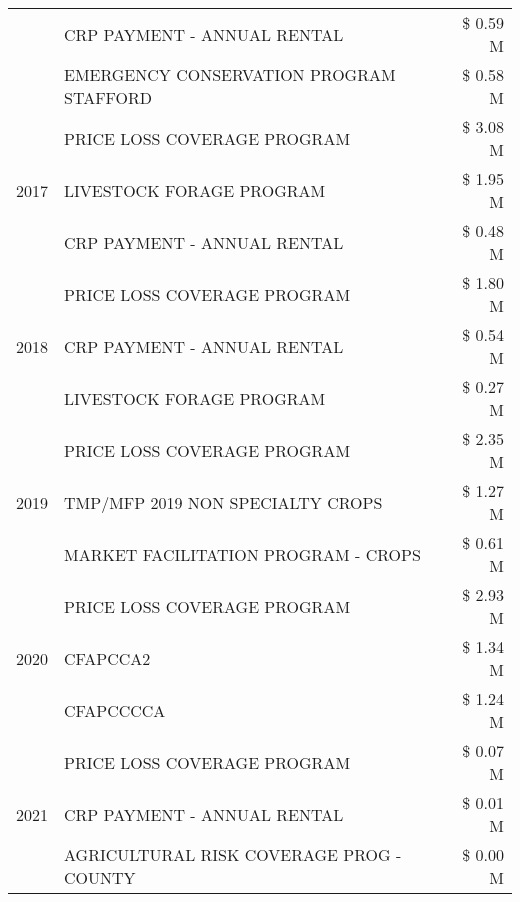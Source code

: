 \begin{tabular}{llr}
 & CRP PAYMENT - ANNUAL RENTAL                   & \$ 0.59 M \\
 & EMERGENCY CONSERVATION PROGRAM STAFFORD       & \$ 0.58 M \\
\cline{1-3}
\multirow[t]{3}{*}{2017} & PRICE LOSS COVERAGE PROGRAM & \$ 3.08 M \\
 & LIVESTOCK FORAGE PROGRAM & \$ 1.95 M \\
 & CRP PAYMENT - ANNUAL RENTAL & \$ 0.48 M \\
\cline{1-3}
\multirow[t]{3}{*}{2018} & PRICE LOSS COVERAGE PROGRAM & \$ 1.80 M \\
 & CRP PAYMENT - ANNUAL RENTAL & \$ 0.54 M \\
 & LIVESTOCK FORAGE PROGRAM & \$ 0.27 M \\
\cline{1-3}
\multirow[t]{3}{*}{2019} & PRICE LOSS COVERAGE PROGRAM & \$ 2.35 M \\
 & TMP/MFP 2019 NON SPECIALTY CROPS & \$ 1.27 M \\
 & MARKET FACILITATION PROGRAM - CROPS & \$ 0.61 M \\
\cline{1-3}
\multirow[t]{3}{*}{2020} & PRICE LOSS COVERAGE PROGRAM & \$ 2.93 M \\
 & CFAPCCA2 & \$ 1.34 M \\
 & CFAPCCCCA & \$ 1.24 M \\
\cline{1-3}
\multirow[t]{3}{*}{2021} & PRICE LOSS COVERAGE PROGRAM & \$ 0.07 M \\
 & CRP PAYMENT - ANNUAL RENTAL & \$ 0.01 M \\
 & AGRICULTURAL RISK COVERAGE PROG - COUNTY & \$ 0.00 M \\
\cline{1-3}
\bottomrule
\end{tabular}
